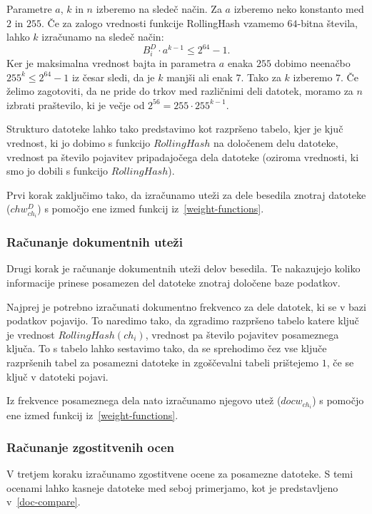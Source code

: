 \documentclass{acm_proc_article-sp}
\begin{document}
Parametre $a$, $k$ in $n$ izberemo na sledeč način. Za $a$ izberemo neko konstanto med $2$ in $255$. Če za zalogo vrednosti funkcije RollingHash vzamemo $64$-bitna števila, lahko $k$ izračunamo na sledeč način: \begin{displaymath}  B_{i}^{D} \cdot a^{k-1} \leq 2^{64}-1.\end{displaymath} Ker je maksimalna vrednost bajta in parametra $a$ enaka $255$ dobimo neenačbo $255^k \leq 2^{64}-1$ iz česar sledi, da je $k$ manjši ali enak $7$. Tako za $k$ izberemo $7$. Če želimo zagotoviti, da ne pride do trkov med različnimi deli datotek, moramo za $n$ izbrati praštevilo, ki je večje od $2^{56}=255\cdot 255^{k-1}$. 

Strukturo datoteke lahko tako predstavimo kot razpršeno tabelo, kjer je kjuč vrednost, ki jo dobimo s funkcijo $RollingHash$ na določenem delu datoteke, vrednost pa število pojavitev pripadajočega dela datoteke (oziroma vrednosti, ki smo jo dobili s funkcijo $RollingHash$).

Prvi korak zaključimo tako, da izračunamo uteži za dele besedila znotraj datoteke ($chw_{ch_i}^D$) s pomočjo ene izmed funkcij iz~\ref{weight-functions}. 

\subsubsection{Računanje dokumentnih uteži}

Drugi korak je računanje dokumentnih uteži delov besedila. Te nakazujejo koliko informacije prinese posamezen del datoteke znotraj določene baze podatkov. 

Najprej je potrebno izračunati dokumentno frekvenco za dele datotek, ki se v bazi podatkov pojavijo. To naredimo tako, da zgradimo razpršeno tabelo katere ključ je vrednost $RollingHash(ch_i)$, vrednost pa število pojavitev posameznega ključa. To s tabelo lahko sestavimo tako, da se sprehodimo čez vse ključe razpršenih tabel za posamezni datoteke in zgoščevalni tabeli prištejemo $1$, če se ključ v datoteki pojavi.

Iz frekvence posameznega dela nato izračunamo njegovo utež ($docw_{ch_i}$) s pomočjo ene izmed funkcij iz~\ref{weight-functions}.

\subsubsection{Računanje zgostitvenih ocen}

V tretjem koraku izračunamo zgostitvene ocene za posamezne datoteke. S temi ocenami lahko kasneje datoteke med seboj primerjamo, kot je predstavljeno v~\ref{doc-compare}.
\end{document}
